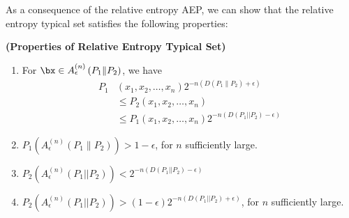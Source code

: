 \documentclass{article}
\newcommand{\bfs}[1]{\textbf{({#1})}}
\begin{document}
As a consequence of the relative entropy AEP, we can show that the relative entropy typical set satisfies the following properties:
\begin{thma}{\bfs{Properties of Relative Entropy Typical Set}}\label{ht:Properties}
\begin{enumerate}
    \item For $\bx\in A_{\epsilon}^{(n)}\left(P_{1} \| P_{2}\right)$, we have
    \begin{align*}
        P_{1}&\left(x_{1}, x_{2}, \ldots, x_{n}\right) 2^{-n\left(D\left(P_{1} \| P_{2}\right)+\epsilon\right)} \\
&\leq P_{2}\left(x_{1}, x_{2}, \ldots, x_{n}\right) \\
&\leq P_{1}\left(x_{1}, x_{2}, \ldots, x_{n}\right) 2^{-n\left(D\left(P_{1}|| P_{2}\right)-\epsilon\right)}
    \end{align*}
    \item $P_{1}\left(A_{\epsilon}^{(n)}\left(P_{1} \| P_{2}\right)\right)>1-\epsilon$, for $n$ sufficiently large.
    \item $P_{2}\left(A_{\epsilon}^{(n)}\left(P_{1}|| P_{2}\right)\right)<2^{-n\left(D\left(P_{1}|| P_{2}\right)-\epsilon\right)}$
    \item $P_{2}\left(A_{\epsilon}^{(n)}\left(P_{1}|| P_{2}\right)\right)>(1-\epsilon) 2^{-n\left(D\left(P_{1}|| P_{2}\right)+\epsilon\right)}$, for $n$ sufficiently large.
\end{enumerate}
\end{thma}
\end{document}
